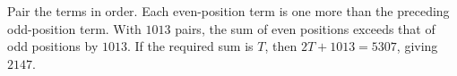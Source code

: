 Pair the terms in order. Each even-position term is one more than the preceding odd-position term. With $1013$ pairs, the sum of even positions exceeds that of odd positions by $1013$. If the required sum is $T$, then $2T+1013=5307$, giving $\boxed{2147}$.
